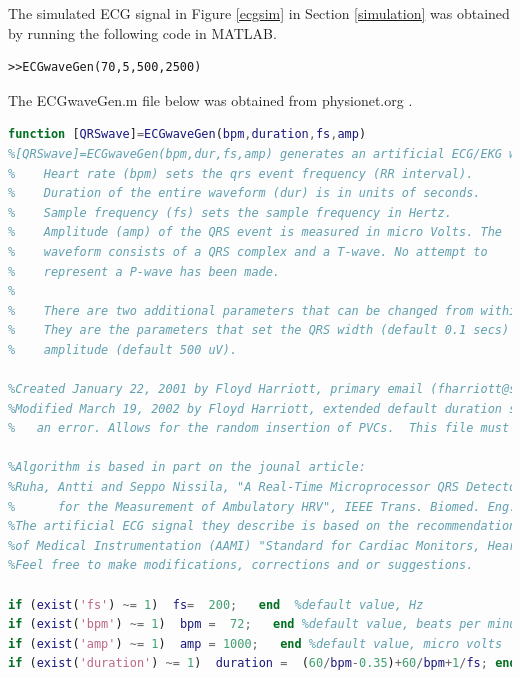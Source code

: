 The simulated ECG signal in Figure \ref{ecgsim} in Section \ref{simulation} was obtained by running the following code in MATLAB.

\begin{lstlisting}
>>ECGwaveGen(70,5,500,2500)
\end{lstlisting}

The ECGwaveGen.m file below was obtained from physionet.org \cite{ecgsimulation}.

\begin{lstlisting}[language=Matlab]
function [QRSwave]=ECGwaveGen(bpm,duration,fs,amp)
%[QRSwave]=ECGwaveGen(bpm,dur,fs,amp) generates an artificial ECG/EKG waveform
%    Heart rate (bpm) sets the qrs event frequency (RR interval). 
%    Duration of the entire waveform (dur) is in units of seconds.
%    Sample frequency (fs) sets the sample frequency in Hertz. 
%    Amplitude (amp) of the QRS event is measured in micro Volts. The
%    waveform consists of a QRS complex and a T-wave. No attempt to 
%    represent a P-wave has been made.
%     
%    There are two additional parameters that can be changed from within the function.
%    They are the parameters that set the QRS width (default 0.1 secs) and the t-wave 
%    amplitude (default 500 uV).

%Created January 22, 2001 by Floyd Harriott, primary email (fharriott@stellate.com), secondary email (fsh@po.cwru.edu)
%Modified March 19, 2002 by Floyd Harriott, extended default duration so that default settings produce a QRS event rather than 
%   an error. Allows for the random insertion of PVCs.  This file must be edited to include PVCs.

%Algorithm is based in part on the jounal article:
%Ruha, Antti and Seppo Nissila, "A Real-Time Microprocessor QRS Detector System with a 1-ms Timing Accuracy
%      for the Measurement of Ambulatory HRV", IEEE Trans. Biomed. Eng. Vol. 44, No. 3, 1997
%The artificial ECG signal they describe is based on the recommendations in the Association for the Advancement
%of Medical Instrumentation (AAMI) "Standard for Cardiac Monitors, Heart Rate Meters and Alarms (draft), Aug. 1981
%Feel free to make modifications, corrections and or suggestions.

if (exist('fs') ~= 1)  fs=  200;   end  %default value, Hz
if (exist('bpm') ~= 1)  bpm =  72;   end %default value, beats per minute
if (exist('amp') ~= 1)  amp = 1000;   end %default value, micro volts
if (exist('duration') ~= 1)  duration =  (60/bpm-0.35)+60/bpm+1/fs; end  %default value gives one cycle, seconds


\end{lstlisting}
